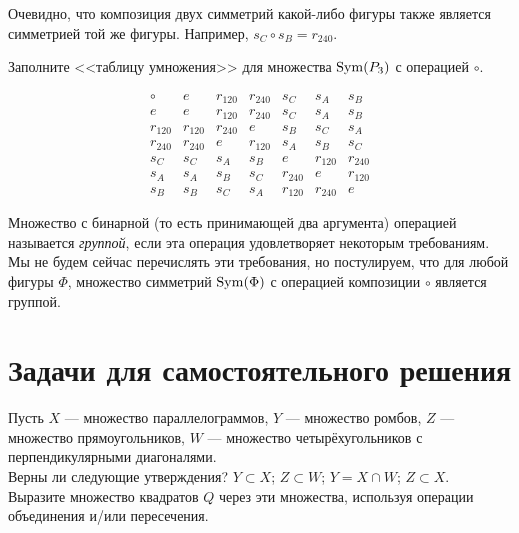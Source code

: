 \documentclass[a4paper,12pt]{article}
\begin{document}
    Очевидно, что композиция двух симметрий какой-либо фигуры также является симметрией той же фигуры. Например, $s_C \circ s_B = r_{240}$.
    
    \problem Заполните <<таблицу умножения>> для множества $\operatorname{Sym}(P_3)$ с операцией $\circ$.
    \begin{center}
        \begin{equation*}
        \newcommand{\tab}{\phantom{r_{240}}}
            \begin{array}{c||c|c|c|c|c|c}
                \circ   & e       & r_{120} & r_{240} & s_C     & s_A     & s_B     \\ \hline \hline
                e       & e       & r_{120} & r_{240} & s_C     & s_A     & s_B     \\ \hline
                r_{120} & r_{120} & r_{240} & e       & s_B     & s_C     & s_A     \\ \hline
                r_{240} & r_{240} & e       & r_{120} & s_A     & s_B     & s_C     \\ \hline
                s_C     & s_C     & s_A     & s_B     & e       & r_{120} & r_{240} \\ \hline
                s_A     & s_A     & s_B     & s_C     & r_{240} & e       & r_{120} \\ \hline
                s_B     & s_B     & s_C     & s_A     & r_{120} & r_{240} & e
            \end{array}
        \end{equation*}
    \end{center}
    
    Множество с бинарной (то есть принимающей два аргумента) операцией называется \emph{группой}, если эта операция удовлетворяет некоторым требованиям. Мы не будем сейчас перечислять эти требования, но постулируем, что для любой фигуры $\Phi$, множество симметрий $\operatorname{Sym}(\Phi)$ с операцией композиции $\circ$ является группой.
    
    \section{Задачи для самостоятельного решения}
    
    \problem Пусть $X$ --- множество параллелограммов, $Y$ --- множество ромбов, $Z$ --- множество прямоугольников, $W$ --- множество четырёхугольников с перпендикулярными диагоналями. \\
    \sub Верны ли следующие утверждения? $Y \subset X$;  $Z \subset W$; $Y = X \cap W$; $Z \subset X$. \\
    \sub Выразите множество квадратов $Q$ через эти множества, используя операции объединения и/или пересечения. 
    
\end{document}
